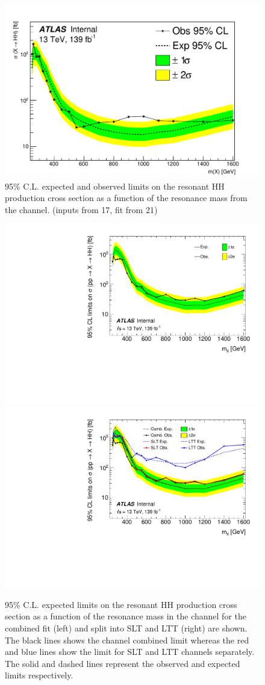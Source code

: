 \begin{figure}
\centering
\includegraphics[width=.8\textwidth]{figures/results/HH/HadHad/HadHadFit21062021/Limits/HadHad_21062021}
\caption{95\% C.L. expected and observed limits on the resonant HH production cross section as a function of the resonance mass from the \hadhad channel. (inputs from 17, fit from 21)}
\label{fig:HadHadLimits}
\end{figure}

\begin{figure}
\centering
\includegraphics[width=.45\textwidth]{figures/results/HH/LepHad/LepHad_Limits_Combined.pdf}
\includegraphics[width=.45\textwidth]{figures/results/HH/LepHad/LepHad_Limits_Split.pdf}
\caption{95\% C.L. expected limits on the resonant HH production cross section as a function of the resonance mass in the \lephad channel for the combined fit (left)
 and split into SLT and LTT (right) are shown.
The black lines shows the \lephad channel combined limit whereas the red and blue lines show the limit for SLT and LTT channels separately. The solid and dashed lines represent the observed and expected limits respectively.}
\label{fig:LepHadLimits}
\end{figure}

